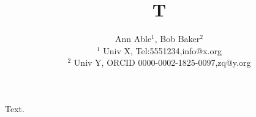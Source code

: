 \documentclass{article}
\begin{document}
\title{T}
\author{Ann Able$^1$, Bob Baker$^2$ \\
$^1$ Univ X, Tel:5551234,info@x.org \\
$^2$ Univ Y, ORCID 0000-0002-1825-0097,zq@y.org}
\maketitle
Text.
\end{document}
